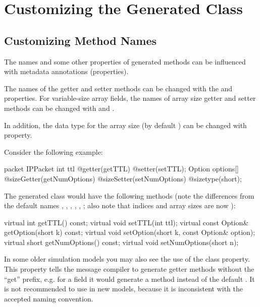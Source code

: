 \section{Customizing the Generated Class}
\label{sec:ch-msg-defs:customizing-generated-class}


\subsection{Customizing Method Names}
\label{sec:ch-msg-defs:customizing-method-names}

The names and some other properties of generated methods can be influenced
with metadata annotations (properties).

The names of the getter and setter methods can be changed with the
 and  properties. For variable-size array
fields, the names of array size getter and setter methods can be changed
with  and .

In addition, the data type for the array size (by default ) can be changed with  property.

Consider the following example:

\begin{msg}
packet IPPacket {
    int ttl @getter(getTTL) @setter(setTTL);
    Option options[] @sizeGetter(getNumOptions)
                     @sizeSetter(setNumOptions)
                     @sizetype(short);
}
\end{msg}

The generated class would have the following methods (note the differences
from the default names , , ,
, , ;
also note that indices and array sizes are now ):

\begin{cpp}
virtual int getTTL() const;
virtual void setTTL(int ttl);
virtual const Option& getOption(short k) const;
virtual void setOption(short k, const Option& option);
virtual short getNumOptions() const;
virtual void setNumOptions(short n);
\end{cpp}

In some older simulation models you may also see the use of the
 class property. This property tells the message
compiler to generate getter methods without the ``get'' prefix, e.g. for a
 field it would generate a  method
instead of the default . It is not recommended to
use  in new models, because it is inconsistent with the
accepted naming convention.

